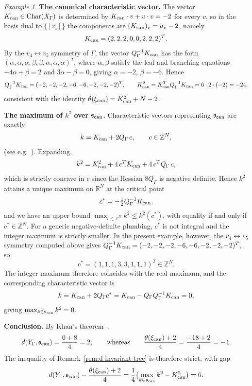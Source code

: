 \documentclass[11pt]{amsart}
\theoremstyle{plain}
\theoremstyle{definition}
\theoremstyle{remark}
\newtheorem{example}[theorem]{Example}
\begin{document}
\begin{example}
\medskip
\noindent\textbf{The canonical characteristic vector.} The vector
$K_{\rm can} \in \operatorname{Char}(X_\Gamma)$ is determined by
$K_{\rm can} \cdot v + v\cdot v = -2$ for every $v$, so in the basis
dual to $\{[v_i]\}$ the components are $(K_{\rm can})_v = a_v - 2$, namely
\[
K_{\rm can} = (2,2,2,0,0,2,2,2)^T.
\]
By the $v_4 \leftrightarrow v_5$ symmetry of $\Gamma$, the vector
$Q_\Gamma^{-1} K_{\rm can}$ has the form
$(\alpha,\alpha,\alpha,\beta,\beta,\alpha,\alpha,\alpha)^T$,
where $\alpha,\beta$ satisfy the leaf and branching equations
$-4\alpha + \beta = 2$ and $3\alpha - \beta = 0$, giving $\alpha=-2$,
$\beta=-6$. Hence
\[
Q_\Gamma^{-1} K_{\rm can} = (-2,-2,-2,-6,-6,-2,-2,-2)^T,
\qquad
K_{\rm can}^2 = K_{\rm can}^T Q_\Gamma^{-1} K_{\rm can} = 6 \cdot 2 \cdot (-2) = -24,
\]
consistent with the identity $\theta(\xi_{\rm can}) = K_{\rm can}^2 + N - 2$.

\medskip
\noindent\textbf{The maximum of $k^2$ over $\mathfrak{s}_{\rm can}$.}
Characteristic vectors representing $\mathfrak{s}_{\rm can}$ are
exactly
\[
k = K_{\rm can} + 2 Q_\Gamma\, c, \qquad c \in \mathbb{Z}^N,
\]
(see e.g.~\cite[eq.~(3)]{Khan2026}). Expanding,
\[
k^2 = K_{\rm can}^2 + 4\,c^T K_{\rm can} + 4\,c^T Q_\Gamma\, c,
\]
which is strictly concave in $c$ since the Hessian $8 Q_\Gamma$ is
negative definite. Hence $k^2$ attains a unique maximum on
$\mathbb{R}^N$ at the critical point
\[
c^* = -\tfrac{1}{2} Q_\Gamma^{-1} K_{\rm can},
\]
and we have an upper bound $\max_{c \in \mathbb{Z}^N} k^2 \leq k^2(c^*)$,
with equality if and only if $c^* \in \mathbb{Z}^N$. For a generic
negative-definite plumbing, $c^*$ is not integral and the integer
maximum is strictly smaller. In the present example, however, the
$v_4 \leftrightarrow v_5$ symmetry computed above gives
$Q_\Gamma^{-1} K_{\rm can} = (-2,-2,-2,-6,-6,-2,-2,-2)^T$, so
\[
c^* = (1,1,1,3,3,1,1,1)^T \in \mathbb{Z}^N.
\]
The integer maximum therefore coincides with the real maximum, and
the corresponding characteristic vector is
\[
k = K_{\rm can} + 2 Q_\Gamma c^*
= K_{\rm can} - Q_\Gamma Q_\Gamma^{-1} K_{\rm can}
= 0,
\]
giving $\max_{k \in \mathfrak{s}_{\rm can}} k^2 = 0$.

\medskip
\noindent\textbf{Conclusion.} By Khan's theorem~\cite{Khan2026},
\[
d(Y_\Gamma, \mathfrak{s}_{\rm can}) = \frac{0+8}{4} = 2,
\qquad\text{whereas}\qquad
\frac{\theta(\xi_{\rm can})+2}{4} = \frac{-18+2}{4} = -4.
\]
The inequality of Remark~\ref{rem:d-invariant-tree} is therefore
strict, with gap
\[
d(Y_\Gamma,\mathfrak{s}_{\rm can}) - \frac{\theta(\xi_{\rm can})+2}{4}
= \frac{1}{4}\bigl(\max_{k\in\mathfrak{s}_{\rm can}} k^2 - K_{\rm can}^2\bigr)
= 6.
\]
\end{example}
\end{document}
